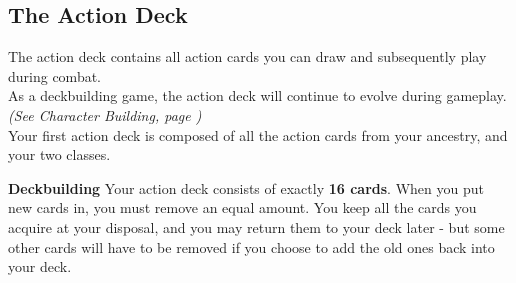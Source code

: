 \subsection{The Action Deck}
The action deck contains all action cards you can draw and subsequently play during combat.\\
As a deckbuilding game, the action deck will continue to evolve during gameplay. \textit{(See Character Building, page \pageref{Section_CharacterBuilding})}\\
Your first action deck is composed of all the action cards from your ancestry, and your two classes. 

\textbf{Deckbuilding} Your action deck consists of exactly \textbf{16 cards}. When you put new cards in, you must remove an equal amount. You keep all the cards you acquire at your disposal, and you may return them to your deck later - but some other cards will have to be removed if you choose to add the old ones back into your deck.

